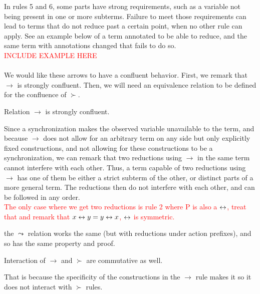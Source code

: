 \remark In rules 5 and 6, some parts have strong requirements, such as a variable not being present in one or more subterms. Failure to meet those requirements can lead to terms that do not reduce past a certain point, when no other rule can apply. See an example below of a term annotated to be able to reduce, and the same term with annotations changed that fails to do so.\\
\textcolor{red}{INCLUDE EXAMPLE HERE}\\~\\
We would like these arrows to have a confluent behavior. First, we remark that $\to$ is strongly confluent. Then, we will need an equivalence relation to be defined for the confluence of $\succ$.

\begin{proposition}
Relation $\to$ is strongly confluent.
\end{proposition}

\begin{myproof}
Since a synchronization makes the observed variable unavailable to the term, and because $\to$ does not allow for an arbitrary term on any side but only explicitly fixed constructions, and not allowing for these constructions to be a synchronization, we can remark that two reductions using $\to$ in the same term cannot interfere with each other. Thus, a term capable of two reductions using $\to$ has one of them be either a strict subterm of the other, or distinct parts of a more general term. The reductions then do not interfere with each other, and can be followed in any order.\\
\textcolor{red}{The only case where we get two reductions is rule 2 where P is also a $\leftrightarrow$, treat that and remark that $x\leftrightarrow y = y\leftrightarrow x$, \ie $\leftrightarrow$ is symmetric.} %
\end{myproof}

\remark the $\leadsto$ relation works the same (but with reductions under action prefixes), and so has the same property and proof.

\begin{proposition}
\label{succ-to-comm}
Interaction of $\to$ and $\succ$ are commutative as well.
\end{proposition}
\begin{myproof}
That is because the specificity of the constructions in the $\to$ rule makes it so it does not interact with $\succ$ rules.
\end{myproof}

